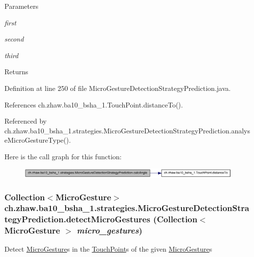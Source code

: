 \begin{DoxyParams}{Parameters}
\item[{\em first}]\item[{\em second}]\item[{\em third}]\end{DoxyParams}
\begin{DoxyReturn}{Returns}

\end{DoxyReturn}


Definition at line 250 of file MicroGestureDetectionStrategyPrediction.java.

References ch.zhaw.ba10\_\-bsha\_\-1.TouchPoint.distanceTo().

Referenced by ch.zhaw.ba10\_\-bsha\_\-1.strategies.MicroGestureDetectionStrategyPrediction.analyseMicroGestureType().

Here is the call graph for this function:\nopagebreak
\begin{figure}[H]
\begin{center}
\leavevmode
\includegraphics[width=341pt]{classch_1_1zhaw_1_1ba10__bsha__1_1_1strategies_1_1MicroGestureDetectionStrategyPrediction_a853328dde879f43b609cf85e698c64cf_cgraph}
\end{center}
\end{figure}
\hypertarget{classch_1_1zhaw_1_1ba10__bsha__1_1_1strategies_1_1MicroGestureDetectionStrategyPrediction_af8639be36ae7218b7f7d2feee8edc86f}{
\subsubsection[{detectMicroGestures}]{\setlength{\rightskip}{0pt plus 5cm}Collection$<${\bf MicroGesture}$>$ ch.zhaw.ba10\_\-bsha\_\-1.strategies.MicroGestureDetectionStrategyPrediction.detectMicroGestures (Collection$<$ {\bf MicroGesture} $>$ {\em micro\_\-gestures})}}
\label{classch_1_1zhaw_1_1ba10__bsha__1_1_1strategies_1_1MicroGestureDetectionStrategyPrediction_af8639be36ae7218b7f7d2feee8edc86f}
Detect \hyperlink{}{MicroGesture}s in the \hyperlink{classch_1_1zhaw_1_1ba10__bsha__1_1_1TouchPoint}{TouchPoint}s of the given \hyperlink{}{MicroGesture}s


